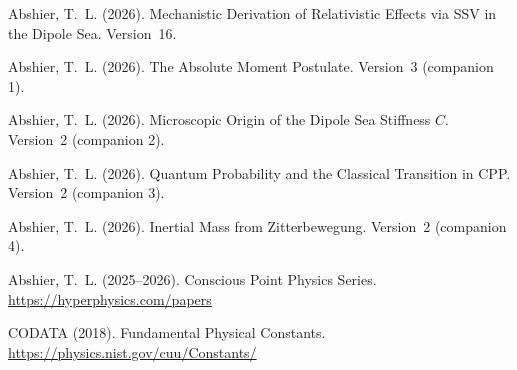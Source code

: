 \documentclass[12pt]{article}
\begin{document}
\begin{enumerate}[label={[\arabic*]}]
  \item Abshier, T.~L. (2026). Mechanistic Derivation of Relativistic
    Effects via SSV in the Dipole Sea. Version~16.

  \item Abshier, T.~L. (2026). The Absolute Moment Postulate. Version~3
    (companion 1).

  \item Abshier, T.~L. (2026). Microscopic Origin of the Dipole Sea
    Stiffness $C$. Version~2 (companion 2).

  \item Abshier, T.~L. (2026). Quantum Probability and the Classical
    Transition in CPP. Version~2 (companion 3).

  \item Abshier, T.~L. (2026). Inertial Mass from Zitterbewegung.
    Version~2 (companion 4).

  \item Abshier, T.~L. (2025--2026). Conscious Point Physics Series.
    \url{https://hyperphysics.com/papers}

  \item CODATA (2018). Fundamental Physical Constants.
    \url{https://physics.nist.gov/cuu/Constants/}
\end{enumerate}
\end{document}

